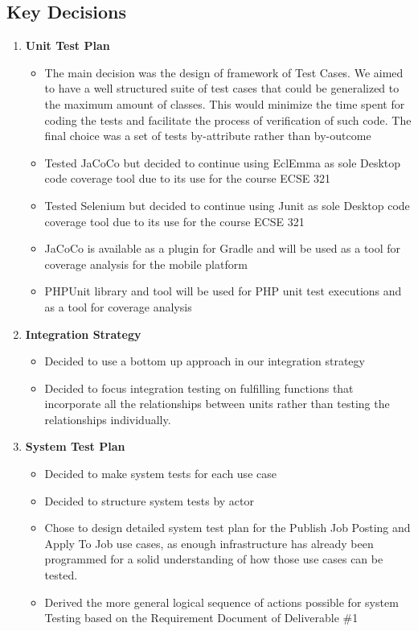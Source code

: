 \documentclass[12pt]{article}
\begin{document}
 \subsection{Key Decisions}
%
 \begin{enumerate}
    \item \textbf{Unit Test Plan}
    \begin{itemize}
     	\item The main decision was the design of framework of Test Cases. We aimed to have a well structured suite of test cases that could be generalized to the maximum amount of classes. This would minimize the time spent for coding the tests and facilitate the process of verification of such code. The final choice was a set of tests by-attribute rather than by-outcome
		\item Tested JaCoCo but decided to continue using EclEmma as sole Desktop code coverage tool due to its use for the course ECSE 321
		\item Tested Selenium but decided to continue using Junit as sole Desktop code coverage tool due to its use for the course ECSE 321
		\item JaCoCo is available as a plugin for Gradle and will be used as a tool for coverage analysis for the mobile platform
		\item PHPUnit library and tool will be used for PHP unit test executions and as a tool for coverage analysis
     \end{itemize}
     \item \textbf{Integration Strategy}
		 \begin{itemize}
			 \item Decided to use a bottom up approach in our integration strategy
			 \item Decided to focus integration testing on fulfilling functions that incorporate all the relationships between units rather than testing the relationships individually.
		 \end{itemize}
	 \item \textbf{System Test Plan}
     \begin{itemize}
     	\item Decided to make system tests for each use case
		\item Decided to structure system tests by actor
		\item Chose to design detailed system test plan for the Publish Job Posting and Apply To Job
			use cases, as enough infrastructure has already been programmed for a solid
			understanding of how those use cases can be tested.
		\item Derived the more general logical sequence of actions possible for system Testing based on the Requirement Document of Deliverable \#1
     \end{itemize}
 \end{enumerate}
%
\end{document}
